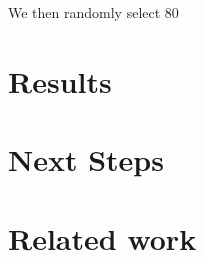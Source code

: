 \documentclass{article} %
\begin{document}
We then randomly select 80%

\section{Results}

\section{Next Steps}

\section{Related work}
\end{document}
